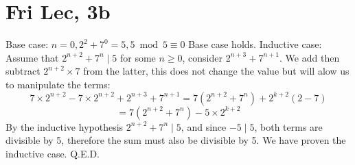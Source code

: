 \documentclass[12pt]{article}
\begin{document}
\section{Fri Lec, 3b}
Base case: $n = 0, 2^2+7^0 = 5, 5 \bmod 5 \equiv 0$ Base case holds.
\newline
Inductive case: Assume that $2^{n+2}+7^n \mid 5$ for some $n \geq 0$, consider $2^{n+3}+7^{n+1}$.
\newline
We add then subtract $2^{n+2}\times 7$ from the latter, this does not change the value but will alow us to manipulate the terms:
$$7 \times 2^{n+2} - 7 \times 2^{n+2} + 2^{n+3}+7^{n+1} = 7(2^{n+2}+7^n)+2^{k+2}(2-7)$$
$$=7(2^{n+2}+7^n) - 5 \times 2^{k+2}$$
By the inductive hypothesis  $2^{n+2}+7^n \mid 5$, and since $-5 \mid 5$, both terms are divisible by 5, therefore the sum must also be divisible by 5.
\newline
We have proven the inductive case. Q.E.D.
\end{document}

